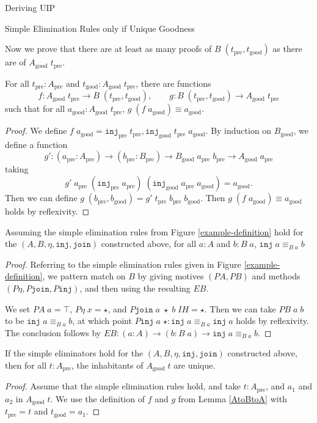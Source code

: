 \documentclass[runningheads]{llncs}
\newcommand{\pre}[1]{{#1}_\text{pre}}
\newcommand{\good}[1]{{#1}_\text{good}}
\newcommand{\Id}[2]{{#1}\equiv{#2}}
\newcommand{\IdA}[3]{{#1}\equiv_{#3}{#2}}
\newcommand{\join}{\texttt{join}}
\newcommand{\inj}{\texttt{inj}}
\begin{document}
\begin{section}{Deriving UIP}
\begin{subsection}{Simple Elimination Rules only if Unique Goodness}

Now we prove that there are at least as many proofs of $B\;(\pre{t},\good{t})$ as there are of $\good{A}\;\pre{t}$.

\begin{lemma}[$\good{A}$ is a retract of $B$]\label{AtoBtoA}
    For all $\pre{t} : \pre{A}$ and $\good{t} : \good{A}\;\pre{t}$, there are functions \[f : \good{A}\;\pre{t} \to B\;(\pre{t},\good{t}),\qquad g : B\;(\pre{t},\good{t})\to \good{A}\;\pre{t}\] such that for all $\good{a} : \good{A}\;\pre{t}$, $\Id{g\;(f\;\good{a})}{\good{a}}$.
\end{lemma}
\begin{proof}
    We define $f\;\good{a} = \pre{\inj}\;\pre{t}, \good{\inj}\;\pre{t}\;\good{a}$.
    By induction on $\good{B}$, we define a function \[g' : (\pre{a} : \pre{A})\to(\pre{b}: \pre{B})\to\good{B}\;\pre{a}\;\pre{b}\to \good{A}\;\pre{a}\] taking \[g'\;\pre{a}\;(\pre{\inj}\;\pre{a})\;(\good{\inj}\;\pre{a}\;\good{a}) = \good{a}.\]
    Then we can define $g\;(\pre{b},\good{b}) = g'\;\pre{t}\;\pre{b}\;\good{b}$.
    Then $\Id{g\;(f\;\good{a})}{\good{a}}$ holds by reflexivity.
\end{proof}

\begin{lemma}[$B$ is contractible]\label{Bcontr}
    Assuming the simple elimination rules from Figure \ref{example-definition} hold for the $(A, B, \eta, \inj, \join)$ constructed above, for all $a : A$ and $b : B\;a$, $\IdA{\inj\;a}{b}{B\;a}$
\end{lemma}
\begin{proof}
    Referring to the simple elimination rules given in Figure \ref{example-definition}, we pattern match on $B$ by giving motives $(PA, PB)$ and methods $(P\eta, P\join, P\inj)$, and then using the resulting $EB$.
    
    We set $PA\;a = \top$, $P\eta\;x = \star$, and $P\join\;a\;\star\;b\;IH = \star$.
    Then we can take $PB\;a\;b$ to be $\IdA{\inj\;a}{b}{B\;a}$, at which point $P\inj\; a\;\star : \IdA{\inj\;a}{\inj\;a}{B\;a}$ holds by reflexivity. The conclusion follows by $EB : (a : A) \to (b : B\;a) \to \IdA{\inj\;a}{b}{B\;a}$.
\end{proof}

\begin{lemma}
    If the simple eliminators hold for the $(A,B,\eta,\inj,\join)$ constructed above, then for all $t : \pre{A}$, the inhabitants of $\good{A}\;t$ are unique.
\end{lemma}
\begin{proof}
    Assume that the simple elimination rules hold, and take $t : \pre{A}$, and $a_1$ and $a_2$ in $\good{A}\;t$. We use the definition of $f$ and $g$ from Lemma \ref{AtoBtoA} with $\pre{t} = t$ and $\good{t} = a_1$.
    

\end{proof}
\end{subsection}
\end{section}
\end{document}
